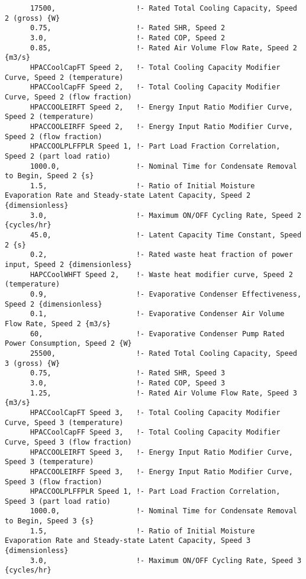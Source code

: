 \begin{lstlisting}
      17500,                   !- Rated Total Cooling Capacity, Speed 2 (gross) {W}
      0.75,                    !- Rated SHR, Speed 2
      3.0,                     !- Rated COP, Speed 2
      0.85,                    !- Rated Air Volume Flow Rate, Speed 2 {m3/s}
      HPACCoolCapFT Speed 2,   !- Total Cooling Capacity Modifier Curve, Speed 2 (temperature)
      HPACCoolCapFF Speed 2,   !- Total Cooling Capacity Modifier Curve, Speed 2 (flow fraction)
      HPACCOOLEIRFT Speed 2,   !- Energy Input Ratio Modifier Curve, Speed 2 (temperature)
      HPACCOOLEIRFF Speed 2,   !- Energy Input Ratio Modifier Curve, Speed 2 (flow fraction)
      HPACCOOLPLFFPLR Speed 1, !- Part Load Fraction Correlation, Speed 2 (part load ratio)
      1000.0,                  !- Nominal Time for Condensate Removal to Begin, Speed 2 {s}
      1.5,                     !- Ratio of Initial Moisture Evaporation Rate and Steady-state Latent Capacity, Speed 2 {dimensionless}
      3.0,                     !- Maximum ON/OFF Cycling Rate, Speed 2 {cycles/hr}
      45.0,                    !- Latent Capacity Time Constant, Speed 2 {s}
      0.2,                     !- Rated waste heat fraction of power input, Speed 2 {dimensionless}
      HAPCCoolWHFT Speed 2,    !- Waste heat modifier curve, Speed 2 (temperature)
      0.9,                     !- Evaporative Condenser Effectiveness, Speed 2 {dimensionless}
      0.1,                     !- Evaporative Condenser Air Volume Flow Rate, Speed 2 {m3/s}
      60,                      !- Evaporative Condenser Pump Rated Power Consumption, Speed 2 {W}
      25500,                   !- Rated Total Cooling Capacity, Speed 3 (gross) {W}
      0.75,                    !- Rated SHR, Speed 3
      3.0,                     !- Rated COP, Speed 3
      1.25,                    !- Rated Air Volume Flow Rate, Speed 3 {m3/s}
      HPACCoolCapFT Speed 3,   !- Total Cooling Capacity Modifier Curve, Speed 3 (temperature)
      HPACCoolCapFF Speed 3,   !- Total Cooling Capacity Modifier Curve, Speed 3 (flow fraction)
      HPACCOOLEIRFT Speed 3,   !- Energy Input Ratio Modifier Curve, Speed 3 (temperature)
      HPACCOOLEIRFF Speed 3,   !- Energy Input Ratio Modifier Curve, Speed 3 (flow fraction)
      HPACCOOLPLFFPLR Speed 1, !- Part Load Fraction Correlation, Speed 3 (part load ratio)
      1000.0,                  !- Nominal Time for Condensate Removal to Begin, Speed 3 {s}
      1.5,                     !- Ratio of Initial Moisture Evaporation Rate and Steady-state Latent Capacity, Speed 3 {dimensionless}
      3.0,                     !- Maximum ON/OFF Cycling Rate, Speed 3 {cycles/hr}

\end{lstlisting}
